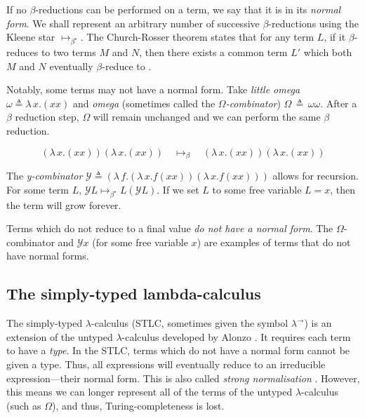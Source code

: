 If no $\beta$-reductions can be performed on a term, we say that it is in its \textit{normal form}.
We shall represent an arbitrary number of successive $\beta$-reductions using the Kleene star
$\mapsto_{\beta^{\star}}$. The Church-Rosser theorem states that for any term $L$, if it
$\beta$-reduces to two terms $M$ and $N$, then there exists a common term $L'$ which both $M$ and
$N$ eventually $\beta$-reduce to \citep{church_properties_1936}.

Notably, some terms may not have a normal form. Take \textit{little omega} $\omega \triangleq
\lambda \, x. (x x)$ and \textit{omega} (sometimes called the $\Omega$\textit{-combinator}) $\Omega
\, \triangleq \, \omega \omega$. After a $\beta$ reduction step, $\Omega$ will remain unchanged and
we can perform the same $\beta$ reduction.

\begin{equation*}
  (\lambda \, x. (x x)) (\lambda \, x. (x x)) \quad
  \mapsto_{\beta} \quad (\lambda \, x. (x x)) (\lambda \, x. (x x))
\end{equation*}

The \textit{y-combinator} $\mathcal{Y} \triangleq (\lambda \, f. (\lambda \, x. f (x x )) (\lambda
\, x. f (xx)))$ allows for recursion. For some term $L$, $\mathcal{Y} L \mapsto_{\beta^{\star}} L
(\mathcal{Y} L)$. If we set $L$ to some free variable $L = x$, then the term will grow forever.

Terms which do not reduce to a final value \textit{do not have a normal form}. The $\Omega$-
combinator and $\mathcal{Y} x$ (for some free variable $x$) are examples of terms that do not have
normal forms.

\subsection{The simply-typed lambda-calculus}
The simply-typed $\lambda$-calculus (STLC, sometimes given the symbol $\lambda^{\rightarrow}$) is an
extension of the untyped $\lambda$-calculus developed by Alonzo \citet{church_formulation_1940}. It
requires each term to have a \textit{type}. In the STLC, terms which do not have a normal form
cannot be given a type. Thus, all expressions will eventually reduce to an irreducible
expression---their normal form. This is also called \textit{strong normalisation}
\citep{pierce_types_2002}. However, this means we can longer represent all of the terms of the
untyped $\lambda$-calculus (such as $\Omega$), and thus, Turing-completeness is lost.


